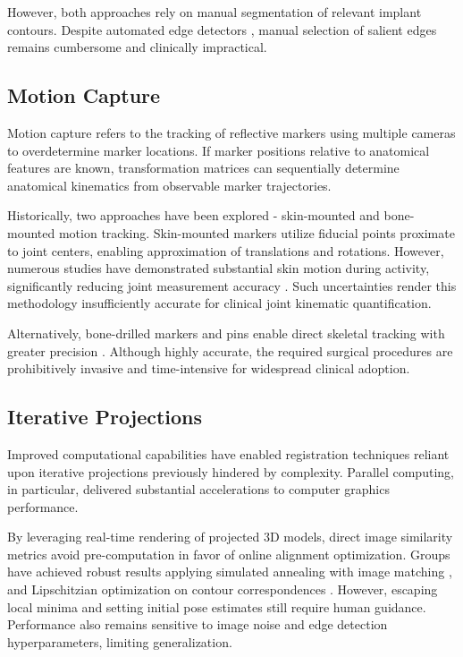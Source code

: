 However, both approaches rely on manual segmentation of relevant implant contours.
Despite automated edge detectors \cite{cannyComputationalApproachEdge1986}, manual selection of salient edges remains cumbersome and clinically impractical.


\subsection{Motion Capture}

Motion capture refers to the tracking of reflective markers using multiple cameras to overdetermine marker locations. If marker positions relative to anatomical features are known, transformation matrices can sequentially determine anatomical kinematics from observable marker trajectories.

Historically, two approaches have been explored - skin-mounted and bone-mounted motion tracking.
Skin-mounted markers utilize fiducial points proximate to joint centers, enabling approximation of translations and rotations.
However, numerous studies have demonstrated substantial skin motion during activity, significantly reducing joint measurement accuracy \cite{gaoInvestigationSoftTissue2008,garlingSofttissueArtefactAssessment2007,linEffectsSoftTissue2016,kuoInfluenceSoftTissue2011}.
Such uncertainties render this methodology insufficiently accurate for clinical joint kinematic quantification.

Alternatively, bone-drilled markers and pins enable direct skeletal tracking with greater precision \cite{lafortuneThreedimensionalKinematicsHuman1992}.
Although highly accurate, the required surgical procedures are prohibitively invasive and time-intensive for widespread clinical adoption.

\subsection{Iterative Projections}
Improved computational capabilities have enabled registration techniques reliant upon iterative projections previously hindered by complexity.
Parallel computing, in particular, delivered substantial accelerations to computer graphics performance.

By leveraging real-time rendering of projected 3D models, direct image similarity metrics avoid pre-computation in favor of online alignment optimization.
Groups have achieved robust results applying simulated annealing with image matching \cite{mahfouzRobustMethodRegistration2003}, and Lipschitzian optimization on contour correspondences \cite{floodAutomatedRegistration3D2018}.
However, escaping local minima and setting initial pose estimates still require human guidance.
Performance also remains sensitive to image noise and edge detection hyperparameters, limiting generalization.


